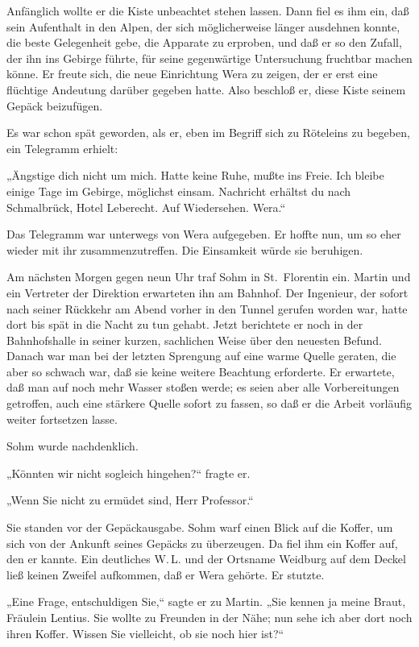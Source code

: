 Anfänglich wollte er die Kiste unbeachtet stehen lassen. Dann fiel
es ihm ein, daß sein Aufenthalt in den Alpen, der sich
möglicherweise länger ausdehnen konnte, die beste Gelegenheit gebe,
die Apparate zu erproben, und daß er so den Zufall, der ihn ins
Gebirge führte, für seine gegenwärtige Untersuchung fruchtbar
machen könne. Er freute sich, die neue Einrichtung Wera zu zeigen,
der er erst eine flüchtige Andeutung darüber gegeben hatte. Also
beschloß er, diese Kiste seinem Gepäck beizufügen.

Es war schon spät geworden, als er, eben im Begriff sich zu
Röteleins zu begeben, ein Telegramm erhielt:

„Ängstige dich nicht um mich. Hatte keine Ruhe, mußte ins Freie.
Ich bleibe einige Tage im Gebirge, möglichst einsam. Nachricht
erhältst du nach Schmalbrück, Hotel Leberecht. Auf Wiedersehen.
Wera.“

Das Telegramm war unterwegs von Wera aufgegeben. Er hoffte nun, um
so eher wieder mit ihr zusammenzutreffen. Die Einsamkeit würde sie
beruhigen.

Am nächsten Morgen gegen neun Uhr traf Sohm in St.~Florentin ein.
Martin und ein Vertreter der Direktion erwarteten ihn am Bahnhof.
Der Ingenieur, der sofort nach seiner Rückkehr am Abend vorher in
den Tunnel gerufen worden war, hatte dort bis spät in die Nacht zu
tun gehabt. Jetzt berichtete er noch in der Bahnhofshalle in seiner
kurzen, sachlichen Weise über den neuesten Befund. Danach war man
bei der letzten Sprengung auf eine warme Quelle geraten, die aber
so schwach war, daß sie keine weitere Beachtung erforderte. Er
erwartete, daß man auf noch mehr Wasser stoßen werde; es seien aber
alle Vorbereitungen getroffen, auch eine stärkere Quelle sofort zu
fassen, so daß er die Arbeit vorläufig weiter fortsetzen lasse.

Sohm wurde nachdenklich.

„Könnten wir nicht sogleich hingehen?“ fragte er.

„Wenn Sie nicht zu ermüdet sind, Herr Professor.“

Sie standen vor der Gepäckausgabe. Sohm warf einen Blick auf die
Koffer, um sich von der Ankunft seines Gepäcks zu überzeugen. Da
fiel ihm ein Koffer auf, den er kannte. Ein deutliches W.\,L. und
der Ortsname Weidburg auf dem Deckel ließ keinen Zweifel aufkommen,
daß er Wera gehörte. Er stutzte.

„Eine Frage, entschuldigen Sie,“ sagte er zu Martin. „Sie kennen ja
meine Braut, Fräulein Lentius. Sie wollte zu Freunden in der Nähe;
nun sehe ich aber dort noch ihren Koffer. Wissen Sie vielleicht, ob
sie noch hier ist?“

